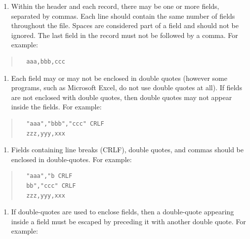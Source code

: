 \documentclass[
]{article}
\providecommand{\tightlist}{%
  \setlength{\itemsep}{0pt}\setlength{\parskip}{0pt}}
\begin{document}
\begin{enumerate}
\def\labelenumi{\arabic{enumi}.}
\setcounter{enumi}{3}
\tightlist
\item
  Within the header and each record, there may be one or more fields,
  separated by commas. Each line should contain the same number of
  fields throughout the file. Spaces are considered part of a field and
  should not be ignored. The last field in the record must not be
  followed by a comma. For example:
\end{enumerate}

\begin{quote}
\begin{verbatim}
  aaa,bbb,ccc
\end{verbatim}
\end{quote}

\begin{enumerate}
\def\labelenumi{\arabic{enumi}.}
\setcounter{enumi}{4}
\tightlist
\item
  Each field may or may not be enclosed in double quotes (however some
  programs, such as Microsoft Excel, do not use double quotes at all).
  If fields are not enclosed with double quotes, then double quotes may
  not appear inside the fields. For example:
\end{enumerate}

\begin{quote}
\begin{verbatim}
  "aaa","bbb","ccc" CRLF
  zzz,yyy,xxx
\end{verbatim}
\end{quote}

\begin{enumerate}
\def\labelenumi{\arabic{enumi}.}
\setcounter{enumi}{5}
\tightlist
\item
  Fields containing line breaks (CRLF), double quotes, and commas should
  be enclosed in double-quotes. For example:
\end{enumerate}

\begin{quote}
\begin{verbatim}
  "aaa","b CRLF
  bb","ccc" CRLF
  zzz,yyy,xxx
\end{verbatim}
\end{quote}

\begin{enumerate}
\def\labelenumi{\arabic{enumi}.}
\setcounter{enumi}{6}
\tightlist
\item
  If double-quotes are used to enclose fields, then a double-quote
  appearing inside a field must be escaped by preceding it with another
  double quote. For example:
\end{enumerate}
\end{document}
